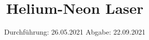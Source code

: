 

\subject{V 61}
\title{Helium-Neon Laser}
\date{%
  Durchführung: 26.05.2021
  \hspace{3em}
  Abgabe: 22.09.2021
}



\maketitle
\thispagestyle{empty}
\tableofcontents
\newpage








\printbibliography{}


